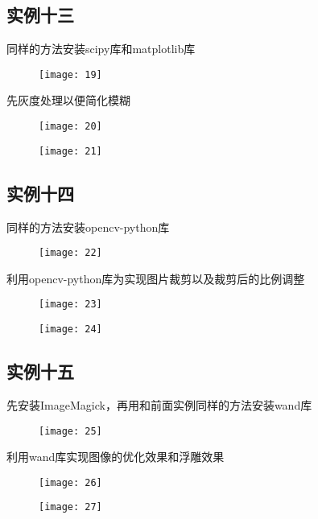 \documentclass[12pt,letterpaper]{article}
\begin{document}
\subsection{实例十三}
同样的方法安装scipy库和matplotlib库
\begin{figure}[H]
\centering
\texttt{[image: 19]}
\end{figure}
先灰度处理以便简化模糊
\begin{figure}[H]
\centering
\texttt{[image: 20]}
\end{figure}
\vspace{-6mm}
\begin{figure}[H]
\centering
\texttt{[image: 21]}
\end{figure}

\subsection{实例十四}
同样的方法安装opencv-python库
\begin{figure}[H]
\centering
\texttt{[image: 22]}
\end{figure}
利用opencv-python库为实现图片裁剪以及裁剪后的比例调整
\begin{figure}[H]
\centering
\texttt{[image: 23]}
\end{figure}
\vspace{-6mm}
\begin{figure}[H]
\centering
\texttt{[image: 24]}
\end{figure}

\subsection{实例十五}
先安装ImageMagick，再用和前面实例同样的方法安装wand库
\begin{figure}[H]
\centering
\texttt{[image: 25]}
\end{figure}
利用wand库实现图像的优化效果和浮雕效果
\begin{figure}[H]
\centering
\texttt{[image: 26]}
\end{figure}
\vspace{-6mm}
\begin{figure}[H]
\centering
\texttt{[image: 27]}
\end{figure}
\end{document}
